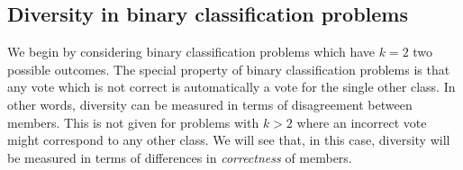 \documentclass[../main.tex]{subfiles}
\begin{document}

\subsection{Diversity in binary classification problems}

We begin by considering binary classification problems which have $k=2$ two possible outcomes. 
The special property of binary classification problems is that any vote which is not correct is automatically a vote for the single other class. In other words, diversity can be measured in terms of disagreement between members. 
This is not given for problems with $k>2$ where an incorrect vote might correspond to any other class. We will see that, in this case, diversity will be measured in terms of differences in \textit{correctness} of members.

\end{document}
